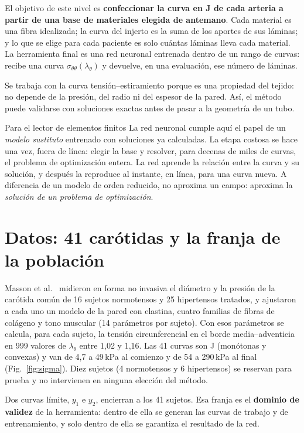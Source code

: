 El objetivo de este nivel es \textbf{confeccionar la curva en J de cada arteria a partir de una base de materiales elegida de antemano}. Cada material es una fibra idealizada; la curva del injerto es la suma de los aportes de sus láminas; y lo que se elige para cada paciente es solo cuántas láminas lleva cada material. La herramienta final es una red neuronal entrenada dentro de un rango de curvas: recibe una curva $\sigma_{\theta\theta}(\lambda_\theta)$ y devuelve, en una evaluación, ese número de láminas.

Se trabaja con la curva tensión--estiramiento porque es una propiedad del tejido: no depende de la presión, del radio ni del espesor de la pared. Así, el método puede validarse con soluciones exactas antes de pasar a la geometría de un tubo.

\begin{caja}{Para el lector de elementos finitos}
La red neuronal cumple aquí el papel de un \emph{modelo sustituto} entrenado con soluciones ya calculadas. La etapa costosa se hace una vez, fuera de línea: elegir la base y resolver, para decenas de miles de curvas, el problema de optimización entera. La red aprende la relación entre la curva y su solución, y después la reproduce al instante, en línea, para una curva nueva. A diferencia de un modelo de orden reducido, no aproxima un campo: aproxima la \emph{solución de un problema de optimización}.
\end{caja}

\section{Datos: 41 carótidas y la franja de la población}
Masson et al.~\cite{masson} midieron en forma no invasiva el diámetro y la presión de la carótida común de 16 sujetos normotensos y 25 hipertensos tratados, y ajustaron a cada uno un modelo de la pared con elastina, cuatro familias de fibras de colágeno y tono muscular (14 parámetros por sujeto). Con esos parámetros se calcula, para cada sujeto, la tensión circunferencial en el borde media--adventicia en 999 valores de $\lambda_\theta$ entre 1,02 y 1,16. Las 41 curvas son J (monótonas y convexas) y van de 4,7 a 49\,kPa al comienzo y de 54 a 290\,kPa al final (Fig.~\ref{fig:sigma}). Diez sujetos (4 normotensos y 6 hipertensos) se reservan para prueba y no intervienen en ninguna elección del método.

Dos curvas límite, $y_1$ e $y_2$, encierran a los 41 sujetos. Esa franja es el \textbf{dominio de validez} de la herramienta: dentro de ella se generan las curvas de trabajo y de entrenamiento, y solo dentro de ella se garantiza el resultado de la red.

